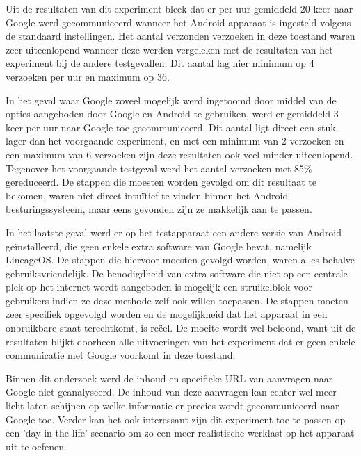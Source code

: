 Uit de resultaten van dit experiment bleek dat er per uur gemiddeld 20 keer naar Google werd gecommuniceerd wanneer het Android apparaat is ingesteld volgens de standaard instellingen. Het aantal verzonden verzoeken in deze toestand waren zeer uiteenlopend wanneer deze werden vergeleken met de resultaten van het experiment bij de andere testgevallen. Dit aantal lag hier minimum op 4 verzoeken per uur en maximum op 36.

In het geval waar Google zoveel mogelijk werd ingetoomd door middel van de opties aangeboden door Google en Android te gebruiken, werd er gemiddeld 3 keer per uur naar Google toe gecommuniceerd. Dit aantal ligt direct een stuk lager dan het voorgaande experiment, en met een minimum van 2 verzoeken en een maximum van 6 verzoeken zijn deze resultaten ook veel minder uiteenlopend. Tegenover het voorgaande testgeval werd het aantal verzoeken met 85\% gereduceerd. De stappen die moesten worden gevolgd om dit resultaat te bekomen, waren niet direct intuïtief te vinden binnen het Android besturingssysteem, maar eens gevonden zijn ze makkelijk aan te passen.

In het laatste geval werd er op het testapparaat een andere versie van Android geïnstalleerd, die geen enkele extra software van Google bevat, namelijk LineageOS. De stappen die hiervoor moesten gevolgd worden, waren alles behalve gebruiksvriendelijk. De benodigdheid van extra software die niet op een centrale plek op het internet wordt aangeboden is mogelijk een struikelblok voor gebruikers indien ze deze methode zelf ook willen toepassen. De stappen moeten zeer specifiek opgevolgd worden en de mogelijkheid dat het apparaat in een onbruikbare staat terechtkomt, is reëel. De moeite wordt wel beloond, want uit de resultaten blijkt doorheen alle uitvoeringen van het experiment dat er geen enkele communicatie met Google voorkomt in deze toestand.

Binnen dit onderzoek werd de inhoud en specifieke URL van aanvragen naar Google niet geanalyseerd. De inhoud van deze aanvragen kan echter wel meer licht laten schijnen op welke informatie er precies wordt gecommuniceerd naar Google toe. Verder kan het ook interessant zijn dit experiment toe te passen op een 'day-in-the-life' scenario om zo een meer realistische werklast op het apparaat uit te oefenen.
